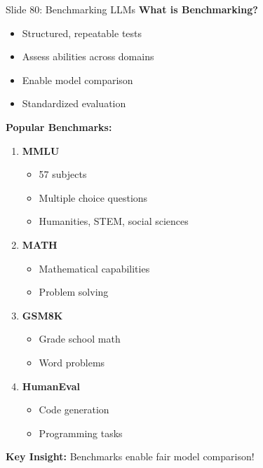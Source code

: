 \documentclass[8pt]{beamer}
\begin{document}
	\begin{frame}{Slide 80: Benchmarking LLMs}
		\fontsize{6.5}{7.5}\selectfont
		\textbf{What is Benchmarking?}
		\begin{itemize}
			\item Structured, repeatable tests
			\item Assess abilities across domains
			\item Enable model comparison
			\item Standardized evaluation
		\end{itemize}
		
		\vspace{0.1cm}
		\textbf{Popular Benchmarks:}
		\begin{enumerate}
			\item \textbf{MMLU}
			\begin{itemize}
				\item 57 subjects
				\item Multiple choice questions
				\item Humanities, STEM, social sciences
			\end{itemize}
			\item \textbf{MATH}
			\begin{itemize}
				\item Mathematical capabilities
				\item Problem solving
			\end{itemize}
			\item \textbf{GSM8K}
			\begin{itemize}
				\item Grade school math
				\item Word problems
			\end{itemize}
			\item \textbf{HumanEval}
			\begin{itemize}
				\item Code generation
				\item Programming tasks
			\end{itemize}
		\end{enumerate}
		
		\textcolor{myblue}{\textbf{Key Insight:}} Benchmarks enable fair model comparison!
	\end{frame}
	
\end{document}
